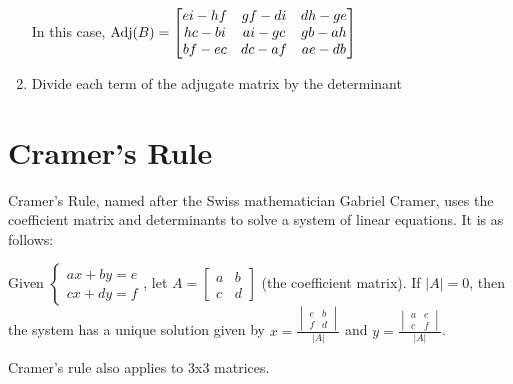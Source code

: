 \documentclass{report}
\begin{document}
\begin{enumerate}
    In this case, 
    $
        \operatorname{Adj}(B)=
        \begin{bmatrix}
            ei-hf & gf-di & dh-ge \\
            hc-bi & ai-gc & gb-ah \\
            bf-ec & dc-af & ae-db
        \end{bmatrix}
    $
    \item Divide each term of the adjugate matrix by the determinant
\end{enumerate}

\section{Cramer's Rule}

Cramer's Rule, named after the Swiss mathematician Gabriel Cramer, uses the coefficient matrix and determinants to solve a system of linear equations. It is as follows:

Given 
$
    \begin{cases}
        ax+by=e \\
        cx+dy=f
    \end{cases}
$, 
let 
$
    A=
    \begin{bmatrix}
        a & b \\
        c & d
    \end{bmatrix}
$ 
(the coefficient matrix). If $|A|=0$, then the system has a unique solution given by
$
    x=\frac{
        \begin{vmatrix}
            e & b \\
            f & d
        \end{vmatrix}
    }{|A|}
$ 
and
$
    y=\frac{
        \begin{vmatrix}
            a & e \\
            c & f
        \end{vmatrix}
    }{|A|}
$.

Cramer's rule also applies to 3x3 matrices.
\end{document}
